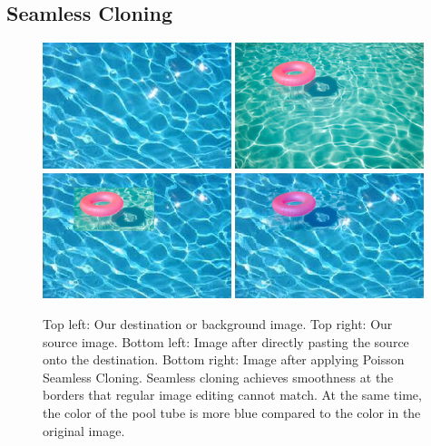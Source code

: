 \documentclass[12pt]{article}
\begin{document}
\subsection{Seamless Cloning}
\noindent\begin{figure}[H]
\centering
\includegraphics[width=0.49\textwidth,keepaspectratio]{data/SeamlessCloning/water/water_back.jpeg}
\includegraphics[width=0.49\textwidth,keepaspectratio]{data/SeamlessCloning/water/water_front.png}\\
\includegraphics[width=0.49\textwidth,keepaspectratio]{data/SeamlessCloning/water/direct_pasting.jpg}
\includegraphics[width=0.49\textwidth,keepaspectratio]{data/SeamlessCloning/water/cloned.jpg}
\caption{Top left: Our destination or background image. Top right: Our source image. Bottom left: Image after directly pasting the source onto the destination. Bottom right: Image after applying Poisson Seamless Cloning. Seamless cloning achieves smoothness at the borders that regular image editing cannot match. At the same time, the color of the pool tube is more blue compared to the color in the original image.}
\label{water}
\end{figure}
\end{document}
